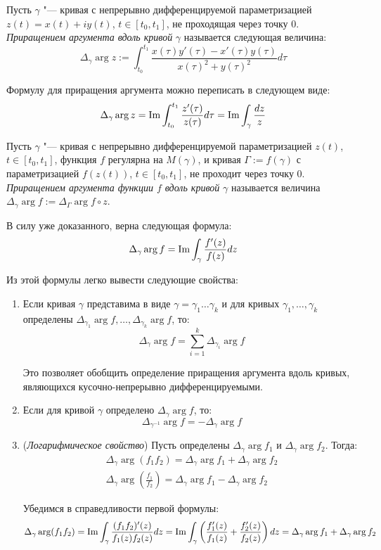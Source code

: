 \begin{definition}
	Пусть $\gamma$ "--- кривая с непрерывно дифференцируемой параметризацией $z(t) = x(t) + iy(t)$, $t \in [t_0, t_1]$, не проходящая через точку $0$. \textit{Приращением аргумента вдоль кривой} $\gamma$ называется следующая величина:
	\[\Delta_\gamma\arg{z} := \int_{t_0}^{t_1}\frac{x(\tau)y'(\tau) - x'(\tau)y(\tau)}{x(\tau)^2 + y(\tau)^2}d\tau\]
\end{definition}

\begin{note}
	Формулу для приращения аргумента можно переписать в следующем виде:
	\[\Delta_\gamma \arg{z} = \operatorname{Im}\int_{t_0}^{t_1}\frac{z'(\tau)}{z(\tau)}d\tau = \operatorname{Im}\int_\gamma \frac{dz}{z}\]
\end{note}

\begin{definition}
	Пусть $\gamma$ "--- кривая с непрерывно дифференцируемой параметризацией $z(t)$, $t \in [t_0, t_1]$, функция $f$ регулярна на $M(\gamma)$, и кривая $\Gamma := f(\gamma)$ с параметризацией $f(z(t))$, $t \in [t_0, t_1]$, не проходит через точку $0$. \textit{Приращением аргумента функции $f$ вдоль кривой} $\gamma$ называется величина $\Delta_\gamma\arg{f} := \Delta_\Gamma\arg{f \circ z}$.
\end{definition}

\begin{note}
	В силу уже доказанного, верна следующая формула:
	\[\Delta_\gamma\arg{f} = \operatorname{Im}\int_\gamma \frac{f'(z)}{f(z)}dz\]
	
	Из этой формулы легко вывести следующие свойства:
	\begin{enumerate}
		\item Если кривая $\gamma$ представима в виде $\gamma = \gamma_1\dotsc \gamma_k$ и для кривых $\gamma_1, \dotsc, \gamma_k$ определены $\Delta_{\gamma_1}\arg f, \dotsc, \Delta_{\gamma_k}\arg f$, то:
		\[\Delta_{\gamma}\arg f = \sum_{i = 1}^k\Delta_{\gamma_i}\arg f\]
		
		Это позволяет обобщить определение приращения аргумента вдоль кривых, являющихся кусочно-непрерывно дифференцируемыми.
		
		\item Если для кривой $\gamma$ определено $\Delta_{\gamma}\arg f$, то:
		\[\Delta_{\gamma^{-1}}\arg f = -\Delta_{\gamma}\arg f\]
		
		\item (\textit{Логарифмическое свойство}) Пусть определены $\Delta_{\gamma}\arg f_1$ и $\Delta_{\gamma}\arg f_2$. Тогда:
		\begin{gather*}
			\Delta_{\gamma}\arg (f_1f_2) = \Delta_{\gamma}\arg f_1 + \Delta_{\gamma}\arg f_2
			\\
			\Delta_{\gamma}\arg \left(\frac{f_1}{f_2}\right) = \Delta_{\gamma}\arg f_1 - \Delta_{\gamma}\arg f_2
		\end{gather*}
	
		Убедимся в справедливости первой формулы:
		\[\Delta_{\gamma}\arg (f_1f_2) =  \operatorname{Im}\int_\gamma \frac{(f_1f_2)'(z)}{f_1(z)f_2(z)}dz = \operatorname{Im}\int_\gamma \left(\frac{f_1'(z)}{f_1(z)} + \frac{f_2'(z)}{f_2(z)}\right)dz = \Delta_{\gamma}\arg f_1 + \Delta_{\gamma}\arg f_2\]
	\end{enumerate}
\end{note}

